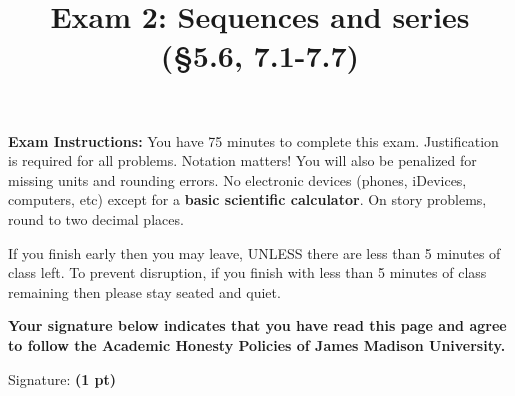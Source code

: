 \documentclass[12pt, addpoints]{exam/exam}
\title{\vspace{-8pc}
\vfill{\Huge
	\bf Exam 2: Sequences and series \\ 
	(\S5.6, 7.1-7.7)} 
	}
\date{}
\newcommand{\1}{^{-1}}
\theoremstyle{plain}
\begin{document}
\begin{coverpages}
\maketitle
\thispagestyle{headandfoot}
\vspace{-4pc}
{\bf Exam Instructions:} You have 75 minutes to complete this exam.  Justification is required for all problems.  Notation matters!  You will also be penalized for missing units and rounding errors.  
No electronic devices (phones, iDevices, computers, etc) except for a \textbf{basic scientific calculator}.  On story problems, round to two decimal places. 

\vspace{1pc}
If you finish early then you may leave, UNLESS there are less than 5 minutes of class left.  To prevent disruption, if you finish with less than 5 minutes of class remaining then please stay seated and quiet.

\begin{flushright}

\vspace{0.3in}

\vspace{0.3in}
\end{flushright}

\vfill
\textbf{Your signature below indicates that you have read this page and agree to follow the Academic Honesty Policies of James Madison University.}  

\vspace{0.3in}
Signature: {\bf (1 pt)} \underline{\hspace{73ex}}

\newpage
\vspace*{\fill}
\gradetable
\end{coverpages}
\end{document}
